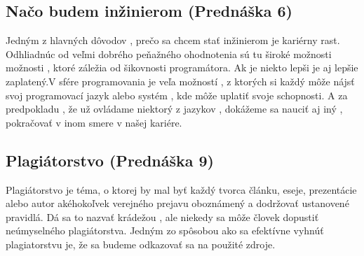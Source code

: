 \documentclass[10pt,oneside,slovak,a4paper]{article}
\begin{document}
\subsection{Načo budem inžinierom (Prednáška 6)}
\quad Jedným z hlavných dôvodov , prečo sa chcem stať inžinierom je kariérny rast. Odhliadnúc od veľmi dobrého peňažného ohodnotenia sú tu široké možnosti možnosti , ktoré záležia od šikovnosti programátora. Ak je niekto lepši je aj lepšie zaplatený.V sfére programovania je veľa možností , z ktorých si každý môže nájsť svoj programovací jazyk alebo systém , kde môže uplatiť svoje schopnosti. A za predpokladu , že už ovládame niektorý z jazykov , dokážeme sa nauciť aj iný , pokračovať v inom smere v našej kariére.

\subsection{Plagiátorstvo (Prednáška 9)}
\quad Plagiátorstvo je téma, o ktorej by mal byť každý tvorca článku, eseje, prezentácie alebo autor akéhokoľvek verejného prejavu oboznámený a dodržovať ustanovené pravidlá. Dá sa to nazvať krádežou , ale niekedy sa môže človek dopustiť neúmyselného plagiátorstva. Jedným zo spôsobou ako sa efektívne vyhnúť plagiatorstvu je, že sa budeme odkazovať sa na použité zdroje.







\end{document}
